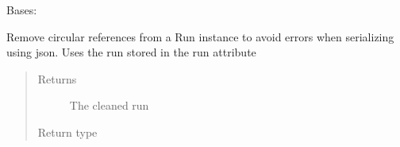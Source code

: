 \documentclass[letterpaper,10pt,english]{sphinxmanual}
\begin{document}
\begin{fulllineitems}
\label{\detokenize{polo.utils:polo.utils.io_utils.XtalWriter}}
Bases: {\hyperref[\detokenize{polo.utils:polo.utils.io_utils.RunSerializer}]{}}

\begin{fulllineitems}
\label{\detokenize{polo.utils:polo.utils.io_utils.XtalWriter.clean_run_for_save}}
Remove circular references from a Run instance to avoid errors
when serializing using json. Uses the run stored in the run attribute
\begin{quote}\begin{description}
\item[{Returns}] \leavevmode
The cleaned run

\item[{Return type}] \leavevmode
{\hyperref[\detokenize{polo.crystallography:polo.crystallography.run.Run}]{}}

\end{description}\end{quote}

\end{fulllineitems}


\begin{fulllineitems}
\label{\detokenize{polo.utils:polo.utils.io_utils.XtalWriter.file_ext}}
\end{fulllineitems}


\begin{fulllineitems}
\label{\detokenize{polo.utils:polo.utils.io_utils.XtalWriter.finished_save}}
\end{fulllineitems}


\end{fulllineitems}
\end{document}
